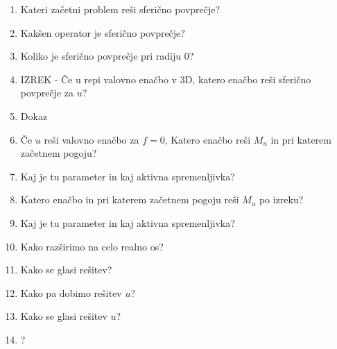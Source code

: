 \documentclass{article}
\begin{document}
\begin{enumerate}
        \item Kateri začetni problem reši sferično povprečje?
        \item Kakšen operator je sferično povprečje?
        \item Koliko je sferično povprečje pri radiju 0?
        \item IZREK - Če u repi valovno enačbo v 3D, katero enačbo reši sferično povprečje za $u$?
        \item Dokaz
        \item Če $u$ reši valovno enačbo za $f = 0$, Katero enačbo reši $M_u$ in pri katerem začetnem pogoju?
        \item Kaj je tu parameter in kaj aktivna spremenljivka?
        \item Katero enačbo in pri katerem začetnem pogoju reši $M_u$ po izreku?
        \item Kaj je tu parameter in kaj aktivna spremenljivka?
        \item Kako razširimo na celo realno os?
        \item Kako se glasi rešitev?
        \item Kako pa dobimo rešitev $u$?
        \item Kako se glasi rešitev $u$?
        \item ?
    \end{enumerate}
\end{document}
